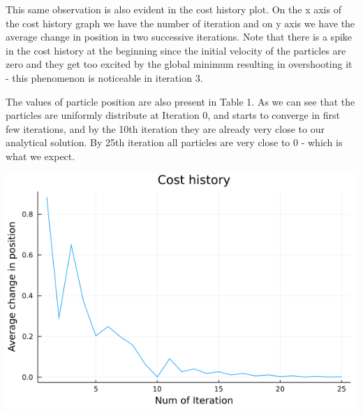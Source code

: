 \documentclass{article}
\begin{document}
This same observation is also evident in the cost history plot. On the x axis of the cost history graph we have the number of iteration and on y axis we have the average change in position in two successive iterations. Note that there is a spike in the cost history at the beginning since the initial velocity of the particles are zero and they get too excited by the global minimum resulting in overshooting it - this phenomenon is noticeable in iteration 3.

The values of particle position are also present in Table 1. As we can see that the particles are uniformly distribute at Iteration 0, and starts to converge in first few iterations, and by the 10th iteration they are already very close to our analytical solution. By 25th iteration all particles are very close to 0 - which is what we expect.

\begin{center}
\includegraphics[width=\linewidth]{./plots/CostHistory.png}
\end{center}
\end{document}

